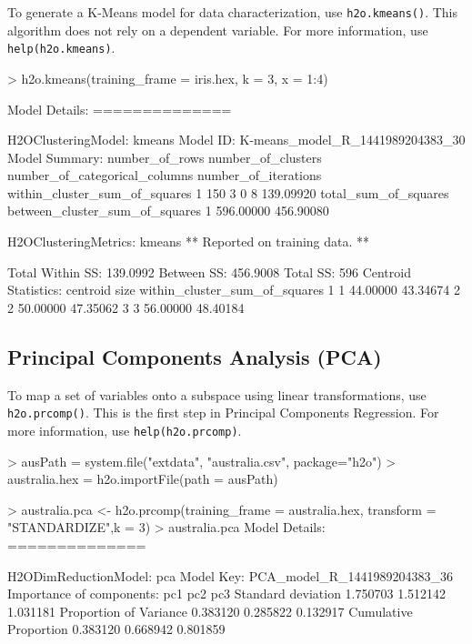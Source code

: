To generate a K-Means model for data characterization, use {\texttt{h2o.kmeans()}}. This algorithm does not rely on a dependent variable. For more information, use {\texttt{help(h2o.kmeans)}}.
\begin{spverbatim}
> h2o.kmeans(training_frame = iris.hex, k = 3, x = 1:4)

Model Details:
==============

H2OClusteringModel: kmeans
Model ID:  K-means_model_R_1441989204383_30 
Model Summary:
  number_of_rows number_of_clusters number_of_categorical_columns number_of_iterations within_cluster_sum_of_squares
1            150                  3                             0                    8                     139.09920
  total_sum_of_squares between_cluster_sum_of_squares
1            596.00000                      456.90080


H2OClusteringMetrics: kmeans
** Reported on training data. **


Total Within SS:  139.0992
Between SS:  456.9008
Total SS:  596 
Centroid Statistics:
  centroid     size within_cluster_sum_of_squares
1        1 44.00000                      43.34674
2        2 50.00000                      47.35062
3        3 56.00000                      48.40184
\end{spverbatim}

\subsection{Principal Components Analysis (PCA)}

To map a set of variables onto a subspace using linear transformations, use {\texttt{h2o.prcomp()}}. This is the first step in Principal Components Regression. For more information, use {\texttt{help(h2o.prcomp)}}.
\begin{spverbatim}
> ausPath = system.file("extdata", "australia.csv", package="h2o")
> australia.hex = h2o.importFile(path = ausPath)

> australia.pca <- h2o.prcomp(training_frame = australia.hex, transform = "STANDARDIZE",k = 3)
> australia.pca
Model Details:
==============

H2ODimReductionModel: pca
Model Key:  PCA_model_R_1441989204383_36 
Importance of components:
                            pc1      pc2      pc3
Standard deviation     1.750703 1.512142 1.031181
Proportion of Variance 0.383120 0.285822 0.132917
Cumulative Proportion  0.383120 0.668942 0.801859
\end{spverbatim}

